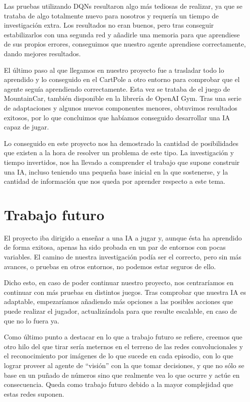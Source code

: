 Las pruebas utilizando DQNs resultaron algo más tediosas de realizar, ya que se trataba de algo totalmente nuevo para nosotros y requería un tiempo de investigación extra. Los resultados no eran buenos, pero tras conseguir estabilizarlos con una segunda red y añadirle una memoria para que aprendiese de sus propios errores, conseguimos que nuestro agente aprendiese correctamente, dando mejores resultados.

El último paso al que llegamos en nuestro proyecto fue a trasladar todo lo aprendido y lo conseguido en el CartPole a otro entorno para comprobar que el agente seguía aprendiendo correctamente. Esta vez se trataba de el juego de MountainCar, también disponible en la librería de OpenAI Gym. Tras una serie de adaptaciones y algunos nuevos componentes menores, obtuvimos resultados exitosos, por lo que concluimos que habíamos conseguido desarrollar una IA capaz de jugar. 

Lo conseguido en este proyecto nos ha demostrado la cantidad de posibilidades que existen a la hora de resolver un problema de este tipo. La investigación y tiempo invertidos, nos ha llevado a comprender el trabajo que supone construir una IA, incluso teniendo una pequeña base inicial en la que sostenerse, y la cantidad de información que nos queda por aprender respecto a este tema.  

\section{Trabajo futuro}

El proyecto iba dirigido a enseñar a una IA a jugar y, aunque ésta ha aprendido de forma exitosa, apenas ha sido probada en un par de entornos con pocas variables. El camino de nuestra investigación podía ser el correcto, pero sin más avances, o pruebas en otros entornos, no podemos estar seguros de ello. 

Dicho esto, en caso de poder continuar nuestro proyecto, nos centraríamos en continuar con más pruebas en distintos juegos. Tras comprobar que nuestra IA es adaptable, empezaríamos añadiendo más opciones a las posibles acciones que puede realizar el jugador, actualizándola para que resulte escalable, en caso de que no lo fuera ya. 

Como último punto a destacar en lo que a trabajo futuro se refiere, creemos que otro hilo del que tirar sería meternos en el terreno de las redes convolucionales \citep{NIPS2012_4824} y el reconocimiento por imágenes de lo que sucede en cada episodio, con lo que lograr proveer al agente de ``visión''  con la que tomar decisiones, y que no sólo se base en un puñado de números sino que realmente vea lo que ocurre y actúe en consecuencia. Queda como trabajo futuro debido a la mayor complejidad que estas redes suponen.

